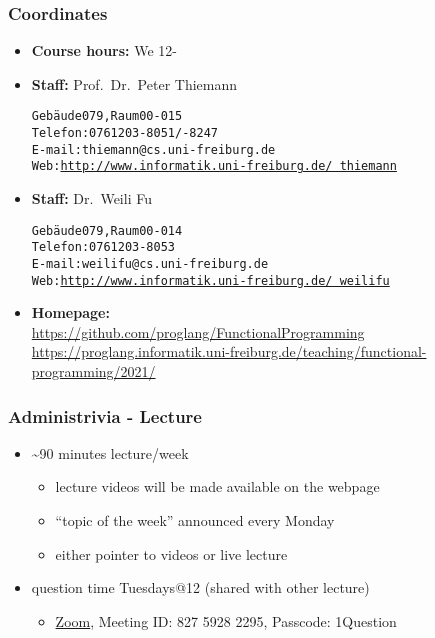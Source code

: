 \documentclass{beamer}
\begin{document}
\begin{frame}
  \titlepage
\end{frame}

\begin{frame}[fragile]
  \frametitle{Coordinates}
  \begin{itemize}
  \item \textbf{Course hours:}  We 12-
  \item \textbf{Staff:} Prof.\ Dr.\ Peter Thiemann\\
\begin{alltt}
Gebäude 079, Raum 00-015
Telefon: 0761 203 -8051/-8247
E-mail: thiemann@cs.uni-freiburg.de
Web: \href{http://www.informatik.uni-freiburg.de/~thiemann}{http://www.informatik.uni-freiburg.de/~thiemann}
\end{alltt}
\item  \textbf{Staff:} Dr.\ Weili Fu\\
\begin{alltt}
Gebäude 079, Raum 00-014
Telefon: 0761 203 -8053
E-mail: weilifu@cs.uni-freiburg.de
Web: \href{http://www.informatik.uni-freiburg.de/~radanne}{http://www.informatik.uni-freiburg.de/~weilifu}
\end{alltt}
  \item\textbf{Homepage:}\\ \footnotesize
    \href{https://github.com/proglang/FunctionalProgramming}{
      https://github.com/proglang/FunctionalProgramming}
    \\
    \href{https://proglang.informatik.uni-freiburg.de/teaching/functional-programming/2021/}{
      https://proglang.informatik.uni-freiburg.de/teaching/functional-programming/2021/}
  \end{itemize}
\end{frame}
\begin{frame}
  \frametitle{Administrivia - Lecture}
  \begin{itemize}
  \item \~{}90 minutes lecture/week
    \begin{itemize}
    \item  lecture videos will be made available on the webpage
    \item ``topic of the week'' announced every Monday
    \item either pointer to videos or live lecture
    \end{itemize}
  \item question time Tuesdays@12 (shared with other lecture)
    \begin{itemize}
    \item \href{https://uni-freiburg.zoom.us/j/82759282295}{Zoom},
      Meeting ID: 827 5928 2295, Passcode: 1Question
    \end{itemize}
  \end{itemize}
\end{frame}
\end{document}
